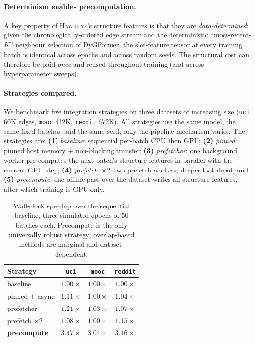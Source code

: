 \documentclass[sigconf,nonacm,review]{acmart}
\newcommand{\method}{\textsc{Hawkeye}\xspace}
\begin{document}
\paragraph{Determinism enables precomputation.}
A key property of \method's structure features is that they are
\emph{data-determined}: given the chronologically-ordered edge stream and the
deterministic ``most-recent-$K$'' neighbour selection of DyGFormer, the
slot-feature tensor at every training batch is identical across epochs and
across random seeds. The structural cost can therefore be paid \emph{once} and
reused throughout training (and across hyperparameter sweeps).

\paragraph{Strategies compared.} We benchmark five integration strategies on
three datasets of increasing size (\texttt{uci} 60K edges, \texttt{mooc} 412K,
\texttt{reddit} 672K). All strategies use the same model, the same fixed
batches, and the same seed; only the pipeline mechanism varies. The
strategies are:
\textbf{(1)} \emph{baseline}: sequential per-batch CPU then GPU;
\textbf{(2)} \emph{pinned}: pinned host memory + non-blocking transfer;
\textbf{(3)} \emph{prefetcher}: one background worker pre-computes the next
batch's structure features in parallel with the current GPU step;
\textbf{(4)} \emph{prefetch~$\times 2$}: two prefetch workers, deeper
lookahead; and
\textbf{(5)} \emph{precompute}: one offline pass over the dataset writes all
structure features, after which training is GPU-only.

\begin{table}[t]
\centering
\caption{Wall-clock speedup over the sequential baseline, three simulated
epochs of $50$ batches each. Precompute is the only universally robust
strategy; overlap-based methods are marginal and dataset-dependent.}
\label{tab:efficiency}
\small
\begin{tabular}{lccc}
\toprule
Strategy & \texttt{uci} & \texttt{mooc} & \texttt{reddit} \\
\midrule
baseline             & $1.00\times$ & $1.00\times$ & $1.00\times$ \\
pinned $+$ async     & $1.11\times$ & $1.00\times$ & $1.04\times$ \\
prefetcher           & $1.21\times$ & $1.03\times$ & $1.07\times$ \\
prefetch $\times 2$  & $1.08\times$ & $1.00\times$ & $1.15\times$ \\
\textbf{precompute}  & $\mathbf{3.47\times}$ & $\mathbf{3.04\times}$ & $\mathbf{3.16\times}$ \\
\bottomrule
\end{tabular}
\end{table}
\end{document}
